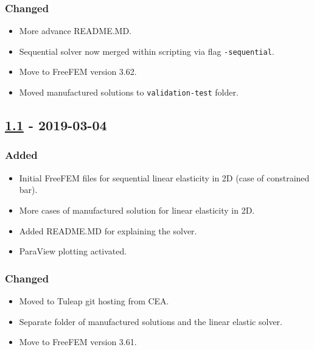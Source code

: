 \subsubsection{Changed}\label{changed-10}

\begin{itemize}
\tightlist
\item
  More advance README.MD.
\item
  Sequential solver now merged within scripting via flag
  \lstinline!-sequential!.
\item
  Move to FreeFEM version 3.62.
\item
  Moved manufactured solutions to \lstinline!validation-test! folder.
\end{itemize}

\subsection{\texorpdfstring{\href{https://gitlab.com/PsdSolver/psd_sources/-/tree/v1.1}{1.1}
- 2019-03-04}{1.1 - 2019-03-04}}\label{section-10}

\subsubsection{Added}\label{added-11}

\begin{itemize}
\tightlist
\item
  Initial FreeFEM files for sequential linear elasticity in 2D (case of
  constrained bar).
\item
  More cases of manufactured solution for linear elasticity in 2D.
\item
  Added README.MD for explaining the solver.
\item
  ParaView plotting activated.
\end{itemize}

\subsubsection{Changed}\label{changed-11}

\begin{itemize}
\tightlist
\item
  Moved to Tuleap git hosting from CEA.
\item
  Separate folder of manufactured solutions and the linear elastic
  solver.
\item
  Move to FreeFEM version 3.61.
\end{itemize}

